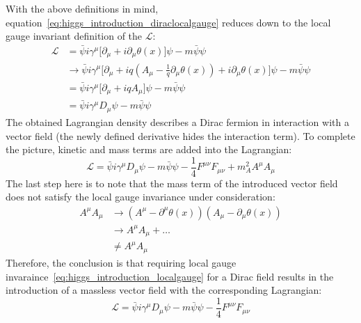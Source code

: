 With the above definitions in mind, equation~\ref{eq:higgs_introduction_diraclocalgauge} reduces down to the local gauge invariant definition of the $\mathcal{L}$:
\begin{equation}\label{eq:higgs_introduction_diraclocalgauge}
    \begin{split}
    \mathcal{L}& = \bar{\psi}i\gamma^{\mu} \lbrack \partial_{\mu} + i\partial_{\mu}\theta(x) \rbrack \psi - m\bar{\psi}\psi\\
    & \rightarrow \bar{\psi}i\gamma^{\mu} \lbrack \partial_{\mu} + iq(A_{\mu} - \frac{1}{q}\partial_{\mu}\theta(x)) + i\partial_{\mu}\theta(x) \rbrack \psi - m\bar{\psi}\psi\\
    & = \bar{\psi}i\gamma^{\mu} \lbrack \partial_{\mu} + iqA_{\mu} \rbrack \psi - m\bar{\psi}\psi\\
    & = \bar{\psi}i\gamma^{\mu}D_{\mu}\psi - m\bar{\psi}\psi
    \end{split}
\end{equation}
The obtained Lagrangian density describes a Dirac fermion in interaction with a vector field (the newly defined derivative hides the interaction term). To complete the picture, kinetic and mass terms are added into the \label{eq:higgs_introduction_diraclocalgauge} Lagrangian:
\begin{equation}
    \label{eq:higgs_introduction_diracLagrangianwithvectormass}
    \mathcal{L} = \bar{\psi}i\gamma^{\mu}D_{\mu}\psi - m\bar{\psi}\psi - \frac{1}{4}F^{\mu\nu}F_{\mu\nu} + m_{A}^{2}A^{\mu}A_{\mu}
\end{equation}
The last step here is to note that the mass term of the introduced vector field does not satisfy the local gauge invariance under consideration:
\begin{equation}\label{eq:higgs_introduction_vectorfieldmassterm}
    \begin{split}
    A^{\mu}A_{\mu}& \rightarrow (A^{\mu} - \partial^{\mu}\theta(x))(A_{\mu} - \partial_{\mu}\theta(x))\\
    & \rightarrow A^{\mu}A_{\mu} + \hdots\\
    & \neq A^{\mu}A_{\mu}
    \end{split}
\end{equation}
Therefore, the conclusion is that requiring local gauge invaraince~\ref{eq:higgs_introduction_localgauge} for a Dirac field results in the introduction of a massless vector field with the corresponding Lagrangian:
\begin{equation}
    \label{eq:higgs_introduction_diracLagrangianwithoutvectormass}
    \mathcal{L} = \bar{\psi}i\gamma^{\mu}D_{\mu}\psi - m\bar{\psi}\psi - \frac{1}{4}F^{\mu\nu}F_{\mu\nu}
\end{equation}
